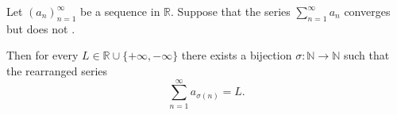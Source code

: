 \begin{theorem} \label{theorem:riemann_rearrangement_theorem_for_conditionally_convergent_series}
    Let $(a_n)_{n=1}^\infty$ be a sequence in $\mathbb{R}$. Suppose that the series $\sum_{n=1}^\infty a_n$ converges but does not .

    Then for every $L \in \mathbb{R} \cup \{+\infty, -\infty\}$ there exists a bijection $\sigma : \mathbb{N} \to \mathbb{N}$ such that the rearranged series
    $$\sum_{n=1}^\infty a_{\sigma(n)} = L.$$
\end{theorem}

